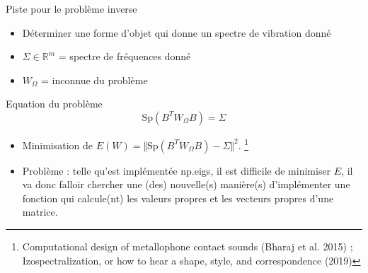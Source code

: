 \documentclass{beamer}
\begin{document}
\begin{frame}{Piste pour le problème inverse}
  
\begin{itemize}
       \item Déterminer une forme d'objet qui donne un spectre de vibration donné
        \item $\Sigma\in\mathbb{R}^m$ = spectre de fréquences donné
        \item $W_\Omega$ = inconnue du problème
\end{itemize}

\begin{block}{Equation du problème}
\[\mbox{Sp}(B^TW_\Omega B)=\Sigma\]
\end{block}

\begin{itemize}
       \item Minimisation de $E(W)=\Vert \mbox{Sp}(B^TW_\Omega B)-\Sigma\Vert^2$. \footnote{Computational design of metallophone contact sounds (Bharaj et al. 2015) ; Izospectralization, or how to hear a shape, style, and correspondence (2019)}
        \item Problème : telle qu'est implémentée np.eigs, il est difficile de minimiser $E$, il va donc falloir chercher une (des) nouvelle(s) manière(s) d'implémenter une fonction qui calcule(nt) les valeurs propres et les vecteurs propres d'une matrice.
\end{itemize}

\end{frame}
\end{document}
